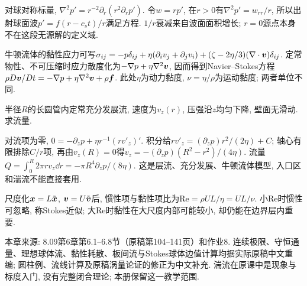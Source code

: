 对球对称标量, $\nabla^2p'=r^{-2}\partial_r(r^2\partial_rp')$. 令$w=rp'$, 在$r>0$有$\nabla^2p'=w_{rr}/r$, 所以出射球面波$p'=f(r-c_st)/r$满足方程. $1/r$衰减来自波面面积增长; $r=0$源点本身不在这段无源解的定义域.

牛顿流体的黏性应力可写$\sigma_{ij}=-p\delta_{ij}+\eta(\partial_iv_j+\partial_jv_i)+(\zeta-2\eta/3)(\nabla\cdot\boldsymbol{v})\delta_{ij}$. 定常物性、不可压缩时应力散度化为$-\nabla p+\eta\nabla^2\boldsymbol{v}$, 因而得到Navier--Stokes方程$\rho D\boldsymbol{v}/Dt=-\nabla p+\eta\nabla^2\boldsymbol{v}+\rho\boldsymbol{f}$. 此处$\eta$为动力黏度, $\nu=\eta/\rho$为运动黏度; 两者单位不同.

\begin{example}
半径$R$的长圆管内定常充分发展流, 速度为$v_z(r)$, 压强沿$z$均匀下降, 壁面无滑动. 求流量.
\end{example}
\begin{solution}
对流项为零, $0=-\partial_zp+\eta r^{-1}(rv'_z)'$. 积分给$rv'_z=(\partial_zp)r^2/(2\eta)+C$; 轴心有限排除$C/r$项, 再由$v_z(R)=0$得$v_z=-(\partial_zp)(R^2-r^2)/(4\eta)$. 流量$Q=\int_0^R2\pi rv_z\dd r=-\pi R^4\partial_zp/(8\eta)$. 这是层流、充分发展、牛顿流体模型, 入口区和湍流不能直接套用.
\end{solution}
尺度化$\boldsymbol{x}=L\tilde{\boldsymbol{x}}$, $\boldsymbol{v}=U\tilde{\boldsymbol{v}}$后, 惯性项与黏性项比为$\mathrm{Re}=\rho UL/\eta=UL/\nu$. 小Re时惯性可忽略, 称Stokes近似; 大Re时黏性在大尺度内部可能较小, 却仍能在边界层内重要.


本章来源: 8.09第6章第6.1--6.8节（原稿第104--141页）和作业8. 连续极限、守恒通量、理想球体流、黏性耗散、板间流与Stokes球体边值计算均据实际原稿中文重编; 圆柱例、流线计算及原稿涡量论证的修正为中文补充. 湍流在原课中是现象与标度入门, 没有完整闭合理论; 本册保留这一教学范围.
